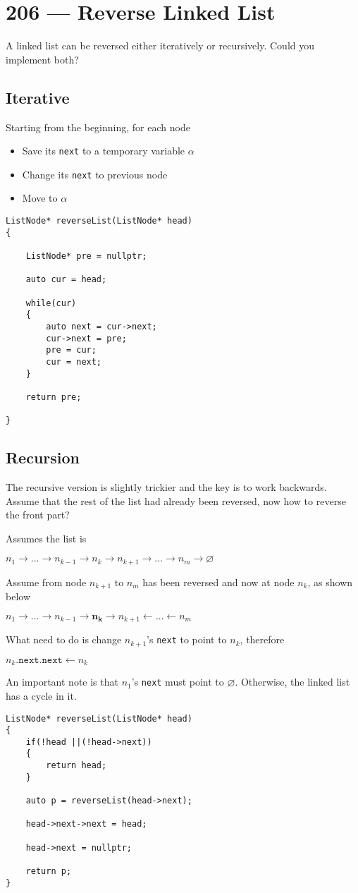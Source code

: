 \section{206 --- Reverse Linked List}
A linked list can be reversed either iteratively or recursively. Could you implement both?
\subsection{Iterative}
Starting from the beginning, for each node
\begin{itemize}
    \item Save its \texttt{next} to a temporary variable $\alpha$
    \item Change its \texttt{next} to previous node
    \item Move to $\alpha$
\end{itemize}
\setcounter{lstlisting}{0}
\begin{lstlisting}[style=customc, caption={Iterative}]
ListNode* reverseList(ListNode* head)
{

    ListNode* pre = nullptr;
    
    auto cur = head;
    
    while(cur)
    {
        auto next = cur->next;
        cur->next = pre;
        pre = cur;
        cur = next;
    }
    
    return pre;

}
\end{lstlisting}
\subsection{Recursion}
The recursive version is slightly trickier and the key is to work backwards. Assume that the rest of the list had already been reversed, now how to reverse the front part?
\par
Assumes the list is 
\par
$n_1\to\ldots\to n_{k-1}\to n_k\to n_{k+1}\to\ldots\to n_m\to \varnothing$
\par
Assume from node $n_{k+1}$ to $n_m$ has been reversed and now at node $n_{k}$, as shown below
\par
$n_1\to\ldots\to n_{k-1}\to \mathbf{n_k}\to n_{k+1}\longleftarrow\ldots\longleftarrow n_m$
\par
What need to do is change $n_{k+1}$'s \texttt{next} to point to $n_k$, therefore
\par
$n_k.\texttt{next}.\texttt{next}\gets n_k$
\par
An important note is that $n_1$'s \texttt{next} must point to $\varnothing$. Otherwise, the linked list has a cycle in it.
\begin{lstlisting}[style=customc, caption={Recursion}]
ListNode* reverseList(ListNode* head)
{
    if(!head ||(!head->next))
    {
        return head;
    }
    
    auto p = reverseList(head->next);
    
    head->next->next = head;
    
    head->next = nullptr;
    
    return p;
}
\end{lstlisting}
